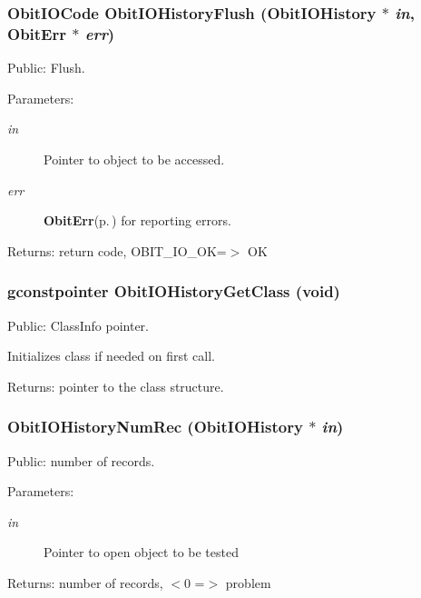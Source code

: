 \subsubsection{\setlength{\rightskip}{0pt plus 5cm}Obit\-IOCode Obit\-IOHistory\-Flush ({\bf Obit\-IOHistory} $\ast$ {\em in}, {\bf Obit\-Err} $\ast$ {\em err})}\label{ObitIOHistory_8h_a17}


Public: Flush. 

\begin{Desc}
\item[Parameters:]
\begin{description}
\item[{\em in}]Pointer to object to be accessed. \item[{\em err}]{\bf Obit\-Err}{\rm (p.\,\pageref{structObitErr})} for reporting errors. \end{description}
\end{Desc}
\begin{Desc}
\item[Returns:]return code, OBIT\_\-IO\_\-OK=$>$ OK \end{Desc}
\subsubsection{\setlength{\rightskip}{0pt plus 5cm}gconstpointer Obit\-IOHistory\-Get\-Class (void)}\label{ObitIOHistory_8h_a8}


Public: Class\-Info pointer. 

Initializes class if needed on first call. \begin{Desc}
\item[Returns:]pointer to the class structure. \end{Desc}
\subsubsection{ Obit\-IOHistory\-Num\-Rec ({\bf Obit\-IOHistory} $\ast$ {\em in})}\label{ObitIOHistory_8h_a20}


Public: number of records. 

\begin{Desc}
\item[Parameters:]
\begin{description}
\item[{\em in}]Pointer to open object to be tested \end{description}
\end{Desc}
\begin{Desc}
\item[Returns:]number of records, $<$0 =$>$ problem \end{Desc}
